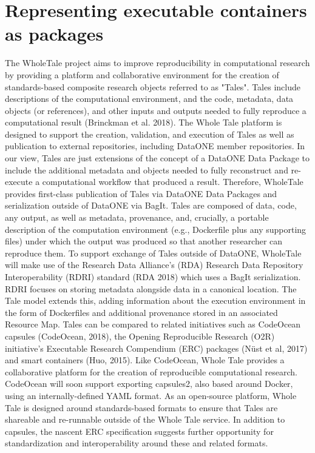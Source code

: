 \documentclass[conference]{IEEEtran}
\begin{document}
\section{Representing executable containers as packages}

The WholeTale project aims to improve reproducibility in computational research by providing a platform and collaborative environment for the creation of standards-based composite research objects referred to as "Tales". Tales include descriptions of the computational environment, and the code, metadata, data objects (or references), and other inputs and outputs needed to fully reproduce a computational result (Brinckman et al. 2018). The Whole Tale platform is designed to support the creation, validation, and execution of Tales as well as publication to external repositories, including DataONE member repositories.
In our view, Tales are just extensions of the concept of a DataONE Data Package to include the additional metadata and objects needed to fully reconstruct and re-execute a computational workflow that produced a result. Therefore, WholeTale provides first-class publication of Tales via DataONE Data Packages and serialization outside of DataONE via BagIt. Tales are composed of data, code, any output, as well as metadata, provenance, and, crucially, a portable description of the computation environment (e.g., Dockerfile plus any supporting files) under which the output was produced so that another researcher can reproduce them.
To support exchange of Tales outside of DataONE, WholeTale will make use of the Research Data Alliance’s (RDA) Research Data Repository Interoperability (RDRI) standard (RDA 2018) which uses a BagIt serialization. RDRI focuses on storing metadata alongside data in a canonical location. The Tale model extends this, adding information about the execution environment in the form of Dockerfiles and additional provenance stored in an associated Resource Map.
Tales can be compared to related initiatives such as CodeOcean capsules (CodeOcean, 2018), the Opening Reproducible Research (O2R) initiative's Executable Research Compendium (ERC) packages (Nüst et al, 2017) and smart containers (Huo, 2015). Like CodeOcean, Whole Tale provides a collaborative platform for the creation of reproducible computational research. CodeOcean will soon support exporting capsules2, also based around Docker, using an internally-defined YAML format. As an open-source platform, Whole Tale is designed around standards-based formats to ensure that Tales are shareable and re-runnable outside of the Whole Tale service. In addition to capsules, the nascent ERC specification suggests further opportunity for standardization and interoperability around these and related formats.
\end{document}
